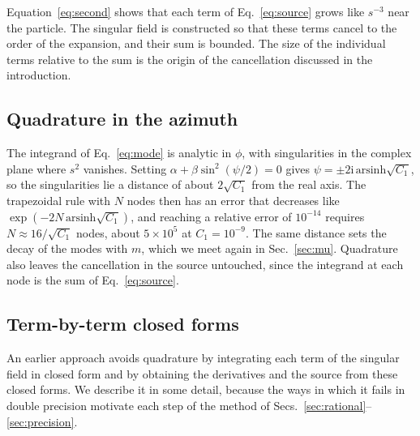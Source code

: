 \documentclass[11pt]{article}
\newcommand{\ii}{\mathrm{i}}
\begin{document}
Equation~\eqref{eq:second} shows that each term of Eq.~\eqref{eq:source}
grows like $s^{-3}$ near the particle. The singular field is constructed so
that these terms cancel to the order of the expansion, and their sum is
bounded. The size of the individual terms relative to the sum is the origin of
the cancellation discussed in the introduction.

\subsection{Quadrature in the azimuth}
\label{sec:direct}

The integrand of Eq.~\eqref{eq:mode} is analytic in $\phi$, with singularities
in the complex plane where $s^2$ vanishes. Setting $\alpha+\beta\sin^2(\psi/2)=0$
gives $\psi=\pm2\ii\,\mathrm{arsinh}\sqrt{C_1}$, so the singularities lie a
distance of about $2\sqrt{C_1}$ from the real axis. The trapezoidal rule with
$N$ nodes then has an error that decreases like
$\exp(-2N\,\mathrm{arsinh}\sqrt{C_1})$, and reaching a relative error of
$10^{-14}$ requires $N\approx16/\sqrt{C_1}$ nodes, about $5\times10^5$ at
$C_1=10^{-9}$. The same distance sets the decay of the modes with $m$, which we
meet again in Sec.~\ref{sec:mu}. Quadrature also leaves the cancellation in
the source untouched, since the integrand at each node is the sum of
Eq.~\eqref{eq:source}.

\subsection{Term-by-term closed forms}
\label{sec:termwise}

An earlier approach avoids quadrature by integrating each term of the singular
field in closed form and by obtaining the derivatives and the source from these
closed forms. We describe it in some detail, because the ways in which it fails
in double precision motivate each step of the method of
Secs.~\ref{sec:rational}--\ref{sec:precision}.
\end{document}
